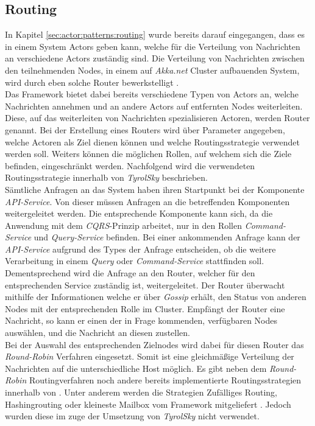 \subsection{Routing}
\label{subsec:implementation:akkaRouting}
In Kapitel \ref{sec:actor:patterns:routing} wurde bereits darauf eingegangen, dass es in einem System Actors geben kann, welche für die Verteilung von Nachrichten an verschiedene Actors zuständig sind. Die Verteilung von Nachrichten zwischen den teilnehmenden Nodes, in einem auf \textit{Akka.net} Cluster aufbauenden System, wird durch eben solche Router bewerkstelligt \citep{Akka.netCommunityAkka.NETDocumentation}. \\
Das Framework bietet dabei bereits verschiedene Typen von Actors an, welche Nachrichten annehmen und an andere Actors auf entfernten Nodes weiterleiten. Diese, auf das weiterleiten von Nachrichten spezialisieren Actoren, werden Router genannt. Bei der Erstellung eines Routers wird über Parameter angegeben, welche Actoren als Ziel dienen können und welche Routingsstrategie verwendet werden soll. Weiters können die möglichen Rollen, auf welchem sich die Ziele befinden, eingeschränkt werden. Nachfolgend wird die verwendeten Routingsstrategie innerhalb von \textit{TyrolSky} beschrieben. \\
Sämtliche Anfragen an das System haben ihren Startpunkt bei der Komponente \textit{API-Service}. Von dieser müssen Anfragen an die betreffenden Komponenten weitergeleitet werden. Die entsprechende Komponente kann sich, da die Anwendung mit dem \textit{CQRS}-Prinzip arbeitet, nur in den Rollen \textit{Command-Service} und \textit{Query-Service} befinden. Bei einer ankommenden Anfrage kann der \textit{API-Service} aufgrund des Types der Anfrage entscheiden, ob die weitere Verarbeitung in einem \textit{Query} oder \textit{Command-Service} stattfinden soll. Dementsprechend wird die Anfrage an den Router, welcher für den entsprechenden Service zuständig ist, weitergeleitet. Der Router überwacht mithilfe der Informationen welche er über \textit{Gossip} erhält, den Status von anderen Nodes mit der entsprechenden Rolle im Cluster. Empfängt der Router eine Nachricht, so kann er einen der in Frage kommenden, verfügbaren Nodes auswählen, und die Nachricht an diesen zustellen. \\
Bei der Auswahl des entsprechenden Zielnodes wird dabei für diesen Router das \textit{Round-Robin} Verfahren eingesetzt. Somit ist eine gleichmäßige Verteilung der Nachrichten auf die unterschiedliche Host möglich. Es gibt neben dem \textit{Round-Robin} Routingverfahren noch andere bereits implementierte Routingsstrategien innerhalb von . Unter anderem werden die Strategien Zufälliges Routing, Hashingrouting oder kleineste Mailbox vom Framework mitgeliefert \citep{Akka.netCommunityAkka.NETDocumentation}. Jedoch wurden diese im zuge der Umsetzung von \textit{TyrolSky} nicht verwendet. \\
